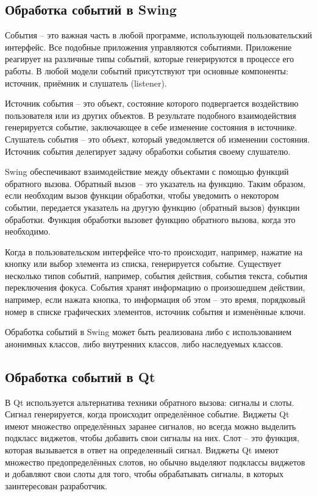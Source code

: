 \subsection{Обработка событий в Swing}

События -- это важная часть в любой программе, использующей пользовательский интерфейс. Все подобные приложения управляются событиями. Приложение реагирует на различные типы событий, которые генерируются в процессе его работы. В любой модели событий присутствуют три основные компоненты: источник, приёмник и слушатель (listener). 

Источник события -- это объект, состояние которого подвергается воздействию пользователя или из других объектов. В результате подобного взаимодействия генерируется событие, заключающее в себе изменение состояния в источнике. Слушатель события -- это объект, который уведомляется об изменении состояния. Источник события делегирует задачу обработки события своему слушателю.

Swing обеспечивают взаимодействие между объектами с помощью функций обратного вызова. Обратный вызов -- это указатель на функцию. Таким образом, если необходим вызов функции обработки, чтобы уведомить о некотором событии, передается указатель на другую функцию (обратный вызов) функции обработки. Функция обработки вызовет функцию обратного вызова, когда это необходимо.

Когда в пользовательском интерфейсе что-то происходит, например, нажатие на кнопку или выбор элемента из списка, генерируется событие. Существует несколько типов событий, например, события действия, события текста, события переключения фокуса. События хранят информацию о произошедшем действии, например, если нажата кнопка, то информация об этом -- это время, порядковый номер в списке графических элементов, источник события и изменённые ключи.

Обработка событий в Swing может быть реализована либо с использованием анонимных классов, либо внутренних классов, либо наследуемых классов.


\subsection{Обработка событий в Qt}

В Qt используется альтернатива техники обратного вызова: сигналы и слоты. Сигнал генерируется, когда происходит определённое событие. Виджеты Qt имеют множество определённых заранее сигналов, но всегда можно выделить подкласс виджетов, чтобы добавить свои сигналы на них. Слот -- это функция, которая вызывается в ответ на определенный сигнал. Виджеты Qt имеют множество предопределённых слотов, но обычно выделяют подклассы виджетов и добавляют свои слоты для того, чтобы обрабатывать сигналы, в которых заинтересован разработчик.

